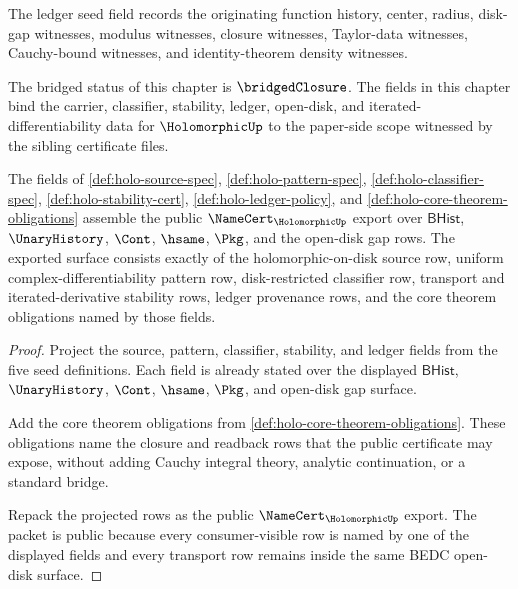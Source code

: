 \begin{definition}
\label{def:holo-ledger-policy}
The ledger seed field records the originating function history, center, radius, disk-gap witnesses, modulus witnesses, closure witnesses, Taylor-data witnesses, Cauchy-bound witnesses, and identity-theorem density witnesses.
\end{definition}

\begin{definition}
\label{def:holo-certificate-seed}
The bridged status of this chapter is $\bridgedClosure$. The fields in this chapter bind the carrier, classifier, stability, ledger, open-disk, and iterated-differentiability data for $\HolomorphicUp$ to the paper-side scope witnessed by the sibling certificate files.
\end{definition}

\begin{theorem}
\label{thm:holomorphic-public-namecert-export}
The fields of \autoref{def:holo-source-spec},
\autoref{def:holo-pattern-spec}, \autoref{def:holo-classifier-spec},
\autoref{def:holo-stability-cert}, \autoref{def:holo-ledger-policy}, and
\autoref{def:holo-core-theorem-obligations} assemble the public
$\NameCert_{\HolomorphicUp}$ export over $\mathsf{BHist}$,
$\UnaryHistory$, $\Cont$, $\hsame$, $\Pkg$, and the open-disk gap rows. The
exported surface consists exactly of the holomorphic-on-disk source row,
uniform complex-differentiability pattern row, disk-restricted classifier row,
transport and iterated-derivative stability rows, ledger provenance rows, and
the core theorem obligations named by those fields.
\end{theorem}
\begin{proof}
Project the source, pattern, classifier, stability, and ledger fields from the
five seed definitions. Each field is already stated over the displayed
$\mathsf{BHist}$, $\UnaryHistory$, $\Cont$, $\hsame$, $\Pkg$, and open-disk gap
surface.

Add the core theorem obligations from
\autoref{def:holo-core-theorem-obligations}. These obligations name the closure
and readback rows that the public certificate may expose, without adding
Cauchy integral theory, analytic continuation, or a standard bridge.

Repack the projected rows as the public $\NameCert_{\HolomorphicUp}$ export.
The packet is public because every consumer-visible row is named by one of the
displayed fields and every transport row remains inside the same BEDC
open-disk surface.
\end{proof}

